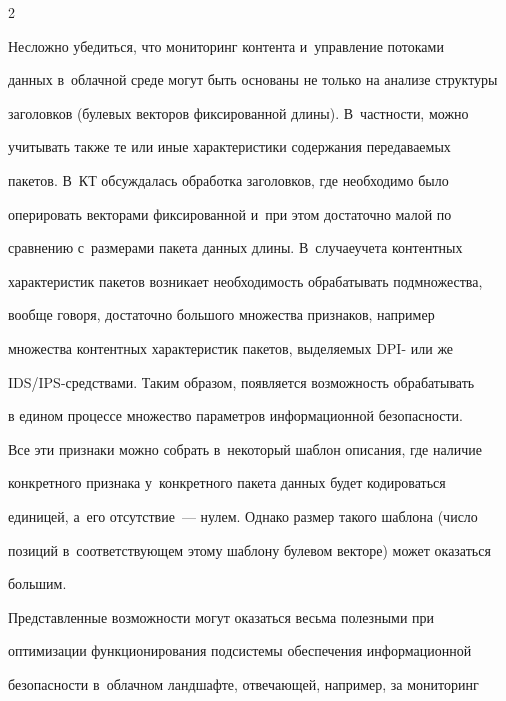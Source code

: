 \begin{multicols}{2}
  


  Несложно убедиться, что мониторинг контента и~управление потоками 


данных в~облачной среде могут быть основаны не только на анализе структуры 


заголовков (булевых векторов фиксированной длины). В~частности, можно 


учитывать также те или иные характеристики содержания переда\-ва\-емых 


пакетов. В~КТ обсуждалась обработка заголовков, где необходимо было 


оперировать векторами фиксированной и~при этом достаточно малой по 


сравнению с~размерами пакета данных длины. В~случае\linebreak учета контентных 


характеристик пакетов возни\-кает необходимость обрабатывать подмножества,\linebreak 


вообще говоря, достаточно большого множества признаков, например 


множества контентных характеристик пакетов, выделяемых DPI- или же 


IDS/IPS-сред\-ст\-ва\-ми. Таким образом, появляется возможность обрабатывать 


в едином процессе множество параметров информационной безопасности.


{ %





}


  


  Все эти признаки можно собрать в~некоторый шаблон описания, где наличие 


конкретного признака у~конкретного пакета данных будет кодироваться 


единицей, а~его отсутствие~--- нулем. Однако размер такого шаблона (число 


позиций в~соответствующем этому шаблону булевом векторе) может оказаться 


большим. 


  


  Представленные возможности могут оказаться весьма полезными при 


оптимизации функци\-о\-нирования подсистемы обеспечения информа\-ционной 


безопасности в~облачном ландшафте, отвеча\-ющей, например, за мониторинг 



\end{multicols}
